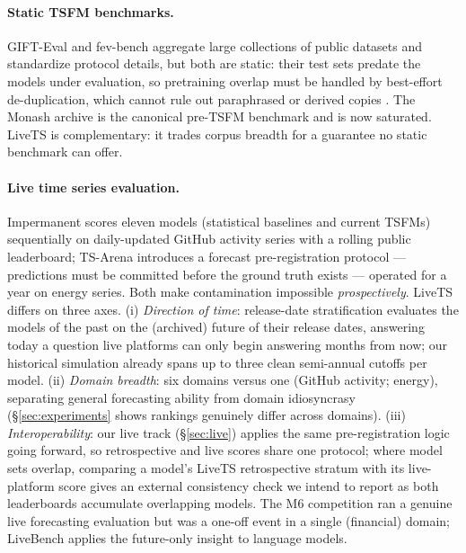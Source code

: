 \documentclass{article}
\begin{document}
\paragraph{Static TSFM benchmarks.} GIFT-Eval \citep{aksu2024gifteval} and fev-bench \citep{shchur2025fev} aggregate large collections of public datasets and standardize protocol details, but both are static: their test sets predate the models under evaluation, so pretraining overlap must be handled by best-effort de-duplication, which cannot rule out paraphrased or derived copies \citep{meyer2025leakage}. The Monash archive \citep{godahewa2021monash} is the canonical pre-TSFM benchmark and is now saturated. LiveTS is complementary: it trades corpus breadth for a guarantee no static benchmark can offer.

\paragraph{Live time series evaluation.} Impermanent \citep{garza2026impermanent} scores eleven models (statistical baselines and current TSFMs) sequentially on daily-updated GitHub activity series with a rolling public leaderboard; TS-Arena \citep{meyer2026tsarena} introduces a forecast pre-registration protocol --- predictions must be committed before the ground truth exists --- operated for a year on energy series. Both make contamination impossible \emph{prospectively}. LiveTS differs on three axes. (i) \emph{Direction of time}: release-date stratification evaluates the models of the past on the (archived) future of their release dates, answering today a question live platforms can only begin answering months from now; our historical simulation already spans up to three clean semi-annual cutoffs per model. (ii) \emph{Domain breadth}: six domains versus one (GitHub activity; energy), separating general forecasting ability from domain idiosyncrasy (\S\ref{sec:experiments} shows rankings genuinely differ across domains). (iii) \emph{Interoperability}: our live track (\S\ref{sec:live}) applies the same pre-registration logic going forward, so retrospective and live scores share one protocol; where model sets overlap, comparing a model's LiveTS retrospective stratum with its live-platform score gives an external consistency check we intend to report as both leaderboards accumulate overlapping models. The M6 competition \citep{makridakis2025m6} ran a genuine live forecasting evaluation but was a one-off event in a single (financial) domain; LiveBench \citep{white2025livebench} applies the future-only insight to language models.
\end{document}
